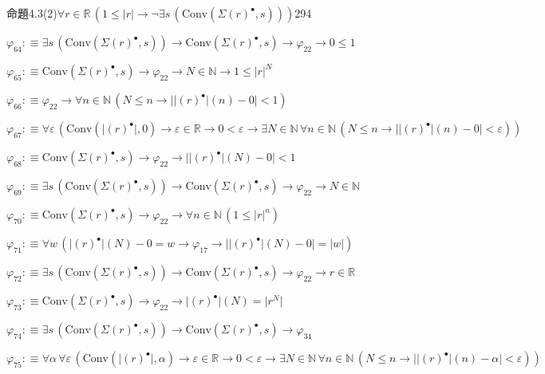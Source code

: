 \begin{fullproof}{命題4.3(2)}{$\forall r \in \mathbb{R}\,(1 \leq \lvert r \rvert \to \neg \exists s\,(\mathrm{Conv}(\Sigma {(r)^{\bullet}},s)))$}{294}
\begin{abbrevlist}
\item $\varphi_{64} :\equiv \exists s\,(\mathrm{Conv}(\Sigma {(r)^{\bullet}},s)) \to \mathrm{Conv}(\Sigma {(r)^{\bullet}},s) \to \varphi_{22} \to 0 \leq 1$
\item $\varphi_{65} :\equiv \mathrm{Conv}(\Sigma {(r)^{\bullet}},s) \to \varphi_{22} \to N \in \mathbb{N} \to 1 \leq {{\lvert r \rvert}^{N}}$
\item $\varphi_{66} :\equiv \varphi_{22} \to \forall n \in \mathbb{N}\,(N \leq n \to \lvert \lvert {(r)^{\bullet}} \rvert(n) - 0 \rvert < 1)$
\item $\varphi_{67} :\equiv \forall \varepsilon\,(\mathrm{Conv}(\lvert {(r)^{\bullet}} \rvert,0) \to \varepsilon \in \mathbb{R} \to 0 < \varepsilon \to \exists N \in \mathbb{N}\,\forall n \in \mathbb{N}\,(N \leq n \to \lvert \lvert {(r)^{\bullet}} \rvert(n) - 0 \rvert < \varepsilon))$
\item $\varphi_{68} :\equiv \mathrm{Conv}(\Sigma {(r)^{\bullet}},s) \to \varphi_{22} \to \lvert \lvert {(r)^{\bullet}} \rvert(N) - 0 \rvert < 1$
\item $\varphi_{69} :\equiv \exists s\,(\mathrm{Conv}(\Sigma {(r)^{\bullet}},s)) \to \mathrm{Conv}(\Sigma {(r)^{\bullet}},s) \to \varphi_{22} \to N \in \mathbb{N}$
\item $\varphi_{70} :\equiv \mathrm{Conv}(\Sigma {(r)^{\bullet}},s) \to \varphi_{22} \to \forall n \in \mathbb{N}\,(1 \leq {{\lvert r \rvert}^{n}})$
\item $\varphi_{71} :\equiv \forall w\,(\lvert {(r)^{\bullet}} \rvert(N) - 0 = w \to \varphi_{17} \to \lvert \lvert {(r)^{\bullet}} \rvert(N) - 0 \rvert = \lvert w \rvert)$
\item $\varphi_{72} :\equiv \exists s\,(\mathrm{Conv}(\Sigma {(r)^{\bullet}},s)) \to \mathrm{Conv}(\Sigma {(r)^{\bullet}},s) \to \varphi_{22} \to r \in \mathbb{R}$
\item $\varphi_{73} :\equiv \mathrm{Conv}(\Sigma {(r)^{\bullet}},s) \to \varphi_{22} \to \lvert {(r)^{\bullet}} \rvert(N) = \lvert {{r}^{N}} \rvert$
\item $\varphi_{74} :\equiv \exists s\,(\mathrm{Conv}(\Sigma {(r)^{\bullet}},s)) \to \mathrm{Conv}(\Sigma {(r)^{\bullet}},s) \to \varphi_{34}$
\item $\varphi_{75} :\equiv \forall \alpha\,\forall \varepsilon\,(\mathrm{Conv}(\lvert {(r)^{\bullet}} \rvert,\alpha) \to \varepsilon \in \mathbb{R} \to 0 < \varepsilon \to \exists N \in \mathbb{N}\,\forall n \in \mathbb{N}\,(N \leq n \to \lvert \lvert {(r)^{\bullet}} \rvert(n) - \alpha \rvert < \varepsilon))$

\end{abbrevlist}
\end{fullproof}
